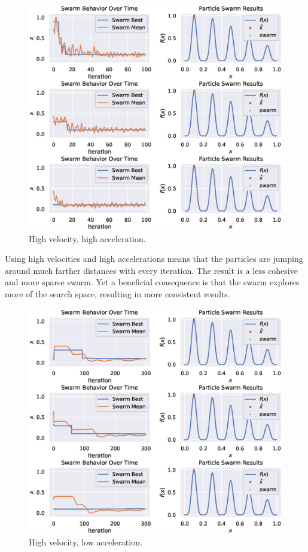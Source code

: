 \documentclass[12pt]{article}
\begin{document}
\begin{figure}[H]
    \centering
    \includegraphics[width=\textwidth]{figures/pso/pso-high-vel-high-accel.eps}
    \caption{High velocity, high acceleration.}\label{fig:pso:high-vel-high-accel}
\end{figure}

Using high velocities and high accelerations means that the particles are jumping around much farther distances with every iteration.
The result is a less cohesive and more sparse swarm.
Yet a beneficial consequence is that the swarm explores more of the search space, resulting in more consistent results.

\begin{figure}[H]
    \centering
    \includegraphics[width=\textwidth]{figures/pso/pso-high-vel-low-accel.eps}
    \caption{High velocity, low acceleration.}\label{fig:pso:high-vel-low-accel}
\end{figure}
\end{document}

